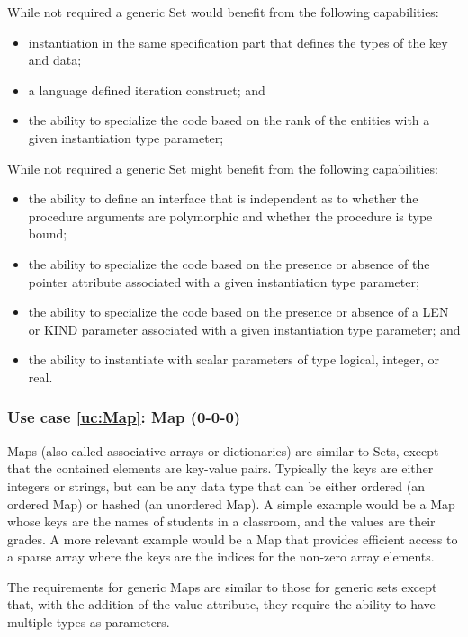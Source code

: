 \documentclass{article}
\newcounter{usecase}
\newcounter{requirement}
\newcommand{\newusecase}[2]{
\refstepcounter{usecase}\label{uc:#1}
\subsubsection{Use case \ref{uc:#1}: #1 (#2)}}
\begin{document}
While not required a generic Set would benefit from the following
capabilities:
\begin{itemize}

\item instantiation in the same specification part that defines the types
  of the key and data;

\item a language defined iteration construct; and

\item the ability to specialize the code based on the rank of the entities
  with a given instantiation type parameter;
\end{itemize}
While not required a generic Set might benefit from the following
capabilities:
\begin{itemize}
\item the ability to define an interface that is independent as to whether 
  the procedure arguments are polymorphic and whether the procedure is
  type bound; 

\item the ability to specialize the code based on the presence or absence
  of the pointer attribute associated with a given instantiation type
  parameter;

\item the ability to specialize the code based on the presence or absence
  of a LEN or KIND parameter associated with a given instantiation
  type parameter; and

\item the ability to instantiate with scalar parameters of type logical,
  integer, or real.
\end{itemize}

\newusecase{Map}{0-0-0} 
Maps (also called associative arrays or dictionaries) are similar to
Sets, except that the contained elements
are key-value pairs.  Typically the keys are either integers or
strings, but can be any data type that can be either ordered (an
ordered Map) or hashed (an unordered Map).  A simple example would be
a Map whose keys are the names of students in a classroom, and the
values are their grades.  A more relevant example would be a Map that
provides efficient access to a sparse array where the keys are the
indices for the non-zero array elements.

The requirements for generic Maps are similar to those for generic
sets except that, with the addition of the value attribute, they
require the ability to have multiple types as parameters.
\end{document}
